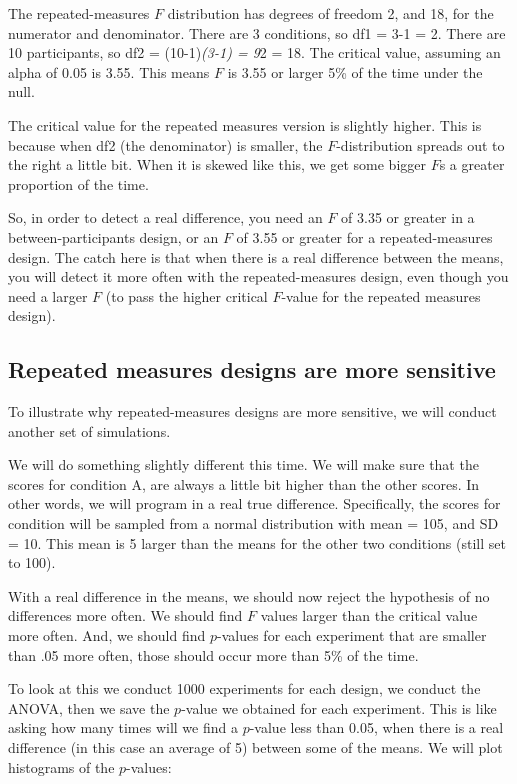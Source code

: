 \documentclass[
]{book}
\begin{document}
The repeated-measures \(F\) distribution has degrees of freedom 2, and 18, for the numerator and denominator. There are 3 conditions, so df1 = 3-1 = 2. There are 10 participants, so df2 = (10-1)\emph{(3-1) = 9}2 = 18. The critical value, assuming an alpha of 0.05 is 3.55. This means \(F\) is 3.55 or larger 5\% of the time under the null.

The critical value for the repeated measures version is slightly higher. This is because when df2 (the denominator) is smaller, the \(F\)-distribution spreads out to the right a little bit. When it is skewed like this, we get some bigger \(F\)s a greater proportion of the time.

So, in order to detect a real difference, you need an \(F\) of 3.35 or greater in a between-participants design, or an \(F\) of 3.55 or greater for a repeated-measures design. The catch here is that when there is a real difference between the means, you will detect it more often with the repeated-measures design, even though you need a larger \(F\) (to pass the higher critical \(F\)-value for the repeated measures design).

\subsection{Repeated measures designs are more sensitive}\label{repeated-measures-designs-are-more-sensitive}

To illustrate why repeated-measures designs are more sensitive, we will conduct another set of simulations.

We will do something slightly different this time. We will make sure that the scores for condition A, are always a little bit higher than the other scores. In other words, we will program in a real true difference. Specifically, the scores for condition will be sampled from a normal distribution with mean = 105, and SD = 10. This mean is 5 larger than the means for the other two conditions (still set to 100).

With a real difference in the means, we should now reject the hypothesis of no differences more often. We should find \(F\) values larger than the critical value more often. And, we should find \(p\)-values for each experiment that are smaller than .05 more often, those should occur more than 5\% of the time.

To look at this we conduct 1000 experiments for each design, we conduct the ANOVA, then we save the \(p\)-value we obtained for each experiment. This is like asking how many times will we find a \(p\)-value less than 0.05, when there is a real difference (in this case an average of 5) between some of the means. We will plot histograms of the \(p\)-values:
\end{document}
